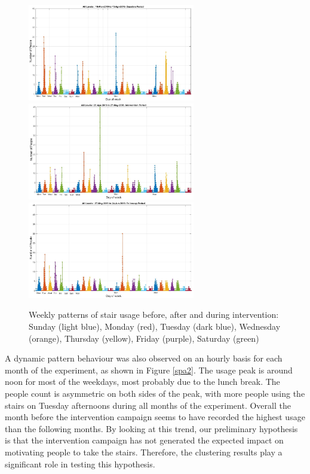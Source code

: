 \begin{figure}[!htbp]
\centering
    \includegraphics[width=0.65\textwidth]{image/Chapters/Chapter6/18-Mar-2019Base.jpg}
    \includegraphics[width=0.65\textwidth]{image/Chapters/Chapter6/29-Apr-2019Int.jpg}
    \includegraphics[width=0.65\textwidth]{image/Chapters/Chapter6/27-May-2019Follow.jpg}
    \caption{Weekly patterns of stair usage before, after and during intervention: Sunday (light blue), Monday (red), Tuesday (dark blue), Wednesday (orange), Thursday (yellow), Friday (purple), Saturday (green)}
    \label{3mon}
\end{figure}



A dynamic pattern behaviour was also observed on an hourly basis for each month of the experiment, as shown in Figure \ref{spa2}. The usage peak is around noon for most of the weekdays, most probably due to the lunch break. The people count is asymmetric on both sides of the peak, with more people using the stairs on Tuesday afternoons during all months of the experiment. Overall the month before the intervention campaign seems to have recorded the highest usage than the following months. By looking at this trend, our preliminary hypothesis is that the intervention campaign has not generated the expected impact on motivating people to take the stairs. Therefore, the clustering results play a significant role in testing this hypothesis.  %

